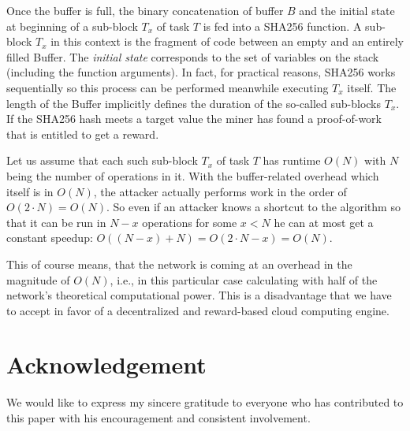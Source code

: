 \documentclass{sig-alternate}
\begin{document}
Once the buffer is full, the binary concatenation of buffer $B$ and the initial state at beginning of a sub-block $T_x$ of task $T$ is fed into a SHA256 function. A sub-block $T_x$ in this context is the fragment of code between an empty and an entirely filled Buffer. The \emph{initial state} corresponds to the set of variables on the stack (including the function arguments). In fact, for practical reasons, SHA256 works sequentially so this process can be performed meanwhile executing $T_x$ itself. The length of the Buffer implicitly defines the duration of the so-called sub-blocks $T_x$. If the SHA256 hash meets a target value the miner has found a proof-of-work that is entitled to get a reward.

Let us assume that each such sub-block $T_x$ of task $T$ has runtime $O(N)$ with $N$ being the number of operations in it. With the buffer-related overhead which itself is in $O(N)$, the attacker actually performs work in the order of $O(2 \cdot N) = O(N)$. So even if an attacker knows a shortcut to the algorithm so that it can be run in $N-x$ operations for some $x<N$ he can at most get a constant speedup: $O((N-x)+N) = O(2 \cdot N-x) = O(N)$.

This of course means, that the network is coming at an overhead in the magnitude of $O(N)$, i.e., in this particular case calculating with half of the network's theoretical computational power. This is a disadvantage that we have to accept in favor of a decentralized and reward-based cloud computing engine.



\section*{Acknowledgement}

We would like to express my sincere gratitude to everyone who has contributed to this paper with his encouragement and consistent involvement.



\end{document}
